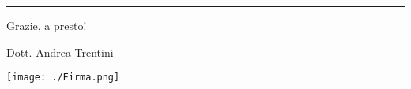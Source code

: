 \documentclass[a4paper,12pt]{article}
\begin{document}
% 
% 
% 
% 
% 



% 
% 
% 
% 


\medskip
\hrule
\medskip
\medskip

\hfill Grazie, a presto!

\hfill Dott. Andrea Trentini

\hfill \texttt{[image: ./Firma.png]}



\end{document}
